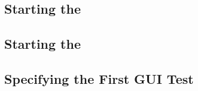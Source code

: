 


\subsection{Starting the \gdserver}


\subsection{Starting the \gdclient}


\subsection{Specifying the First GUI Test}



